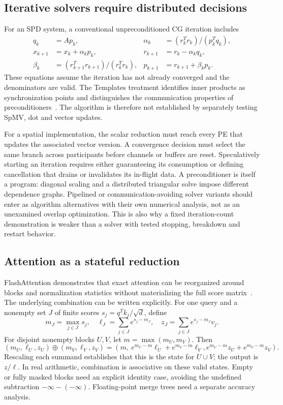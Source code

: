 \documentclass[final,3p,times,authoryear]{elsarticle}
\begin{document}
\subsection{Iterative solvers require distributed decisions}
For an SPD system, a conventional unpreconditioned CG iteration includes
\begin{align}
 q_k&=Ap_k,& \alpha_k&=(r_k^Tr_k)/(p_k^Tq_k),\\
 x_{k+1}&=x_k+\alpha_kp_k,&r_{k+1}&=r_k-\alpha_kq_k,\\
 \beta_k&=(r_{k+1}^Tr_{k+1})/(r_k^Tr_k),&
 p_{k+1}&=r_{k+1}+\beta_kp_k.
\end{align}
These equations assume the iteration has not already converged and the denominators are valid. The Templates treatment identifies inner products as synchronization points and distinguishes the communication properties of preconditioners~\citep{templates1994}. The algorithm is therefore not established by separately testing SpMV, dot and vector updates.

For a spatial implementation, the scalar reduction must reach every PE that updates the associated vector version. A convergence decision must select the same branch across participants before channels or buffers are reset. Speculatively starting an iteration requires either guaranteeing its consumption or defining cancellation that drains or invalidates its in-flight data. A preconditioner is itself a program: diagonal scaling and a distributed triangular solve impose different dependence graphs. Pipelined or communication-avoiding solver variants should enter as algorithm alternatives with their own numerical analysis, not as an unexamined overlap optimization. This is also why a fixed iteration-count demonstration is weaker than a solver with tested stopping, breakdown and restart behavior.

\subsection{Attention as a stateful reduction}
FlashAttention demonstrates that exact attention can be reorganized around blocks and normalization statistics without materializing the full score matrix~\citep{flash2022}. The underlying combination can be written explicitly. For one query and a nonempty set $J$ of finite scores $s_j=q^Tk_j/\sqrt d$, define
\begin{equation}
 m_J=\max_{j\in J}s_j,\quad
 \ell_J=\sum_{j\in J}e^{s_j-m_J},\quad
 z_J=\sum_{j\in J}e^{s_j-m_J}v_j.
\end{equation}
For disjoint nonempty blocks $U,V$, let $m=\max(m_U,m_V)$. Then
\begin{equation}\label{eq:softmax-merge}
 (m_U,\ell_U,z_U)\oplus(m_V,\ell_V,z_V)
 =\left(m,\ e^{m_U-m}\ell_U+e^{m_V-m}\ell_V,
             e^{m_U-m}z_U+e^{m_V-m}z_V\right).
\end{equation}
Rescaling each summand establishes that this is the state for $U\cup V$; the output is $z/\ell$. In real arithmetic, combination is associative on these valid states. Empty or fully masked blocks need an explicit identity case, avoiding the undefined subtraction $-\infty-(-\infty)$. Floating-point merge trees need a separate accuracy analysis.
\end{document}
